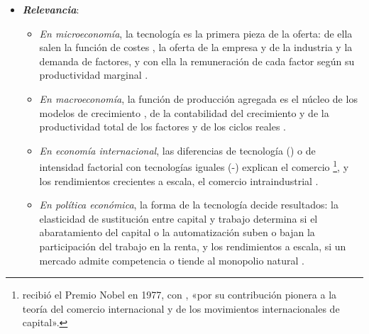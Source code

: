 \documentclass[11pt]{article}
\begin{document}
\begin{itemize}
\item \textbf{\emph{Relevancia}}:
  \begin{itemize}
  \item \emph{En microeconomía}, la tecnología es la primera pieza de la oferta: de ella salen la función de costes , la oferta de la empresa y de la industria  y la demanda de factores, y con ella la remuneración de cada factor según su productividad marginal .
  \item \emph{En macroeconomía}, la función de producción agregada es el núcleo de los modelos de crecimiento  , de la contabilidad del crecimiento y de la productividad total de los factores  y de los ciclos reales .
  \item \emph{En economía internacional}, las diferencias de tecnología () o de intensidad factorial con tecnologías iguales (-) explican el comercio \footnote{ recibió el Premio Nobel en 1977, con , «por su contribución pionera a la teoría del comercio internacional y de los movimientos internacionales de capital»\nocite{Nobel1977MeadeOhlin}.}, y los rendimientos crecientes a escala, el comercio intraindustrial .
  \item \emph{En política económica}, la forma de la tecnología decide resultados: la elasticidad de sustitución entre capital y trabajo determina si el abaratamiento del capital o la automatización suben o bajan la participación del trabajo en la renta, y los rendimientos a escala, si un mercado admite competencia o tiende al monopolio natural .
  \end{itemize}


\end{itemize}
\end{document}
